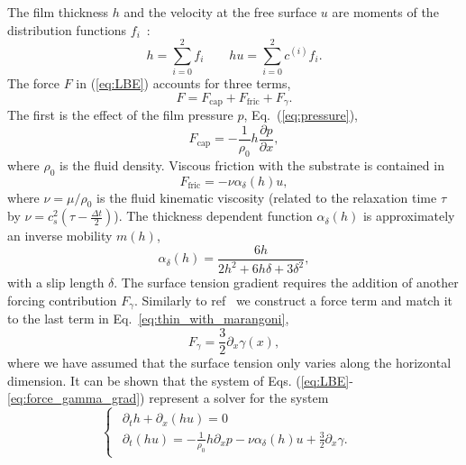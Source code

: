 \documentclass[twocolumn,amsmath,amssymb,showpacs,pre,nofootinbib,superscriptaddress]{revtex4-1} %
\begin{document}
The film thickness $h$ and the velocity at the free surface $u$ are moments of the distribution functions $f_i$~\cite{Salmon:1999:0022-2402:503, PhysRevE.65.036309, PhysRevE.104.034801}:
\begin{equation}\label{eq:hydrofields}
    h= \sum_{i=0}^2 f_i \qquad hu = \sum_{i=0}^2 c^{(i)} f_i.
\end{equation}
The force $F$ in (\ref{eq:LBE}) accounts for three terms,
\begin{equation}\label{eq:force}
    F = F_{\text{cap}} + F_{\text{fric}} + F_{\gamma}.  
\end{equation}
The first is the effect of the film pressure $p$, Eq.~(\ref{eq:pressure}), 
\begin{equation}\label{eq:capillary_force}
    F_{\text{cap}} = -\frac{1}{\rho_0} h \frac{\partial p}{\partial x},
\end{equation}
where $\rho_0$ is the fluid density. 
Viscous friction with the substrate is contained in
\begin{equation}\label{eq:fric_force}
    F_{\text{fric}} = -\nu \alpha_{\delta}(h) u,
\end{equation}
where $\nu=\mu/\rho_0$ is the fluid kinematic viscosity (related to the relaxation time $\tau$ by $\nu = c_s^2\left(\tau-\frac{\Delta t}{2}\right)$).
The thickness dependent function $\alpha_{\delta}(h)$ is approximately an inverse mobility $m(h)$,
\begin{equation}\label{eq:fric_alpha}
     \alpha_{\delta}(h) = \frac{6 h}{2h^2 + 6h\delta + 3\delta^2},
\end{equation}
with a slip length $\delta$.
The surface tension gradient requires the addition of another forcing contribution $F_{\gamma}$.
Similarly to ref~\cite{PhysRevE.104.034801} we construct a force term and match it to the last term in Eq.~\ref{eq:thin_with_marangoni}, 
\begin{equation}\label{eq:force_gamma_grad}
    F_{\gamma} = \frac{3}{2}\partial_x\gamma(x),
\end{equation}
where we have assumed that the surface tension only varies along the horizontal dimension.
It can be shown that the system of Eqs. (\ref{eq:LBE}-\ref{eq:force_gamma_grad}) represent a solver for the system
\begin{equation}\label{eq:lubr2eq1surf}
\begin{cases}
\begin{array}{ll}
\partial_t h + \partial_x (h u)  = 0 & \\ 
\partial_t (h u) = -\frac{1}{\rho_0}h\partial_x p -\nu\alpha_{\delta}(h)u + \frac{3}{2}\partial_x\gamma.
\end{array}
\end{cases}
\end{equation}
\end{document}
